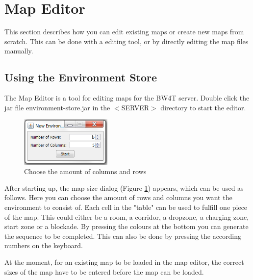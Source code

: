 \newpage

\section{Map Editor}\label{MapEditor}
This section describes how you can edit existing maps or create new maps from scratch. This can be done with a editing tool, or by directly editing the map files manually.




\subsection{Using the Environment Store}
The Map Editor is a tool for editing maps for the BW4T server. Double click the jar file environment-store.jar  in the $<$SERVER$>$ directory to start the  editor.

\begin{figure}
  \begin{center}
    \includegraphics[width=0.4\textwidth]{EnvironmentStore/SizeDialog.png}
  \end{center}
  \caption{Choose the amount of columns and rows}\label{fig:MapSize}
\end{figure}


After starting up, the map size dialog (Figure \ref{fig:MapSize}) appears, which can be used as follows.
Here you can choose the amount of rows and columns you want the environment to consist of. Each cell in the "table" can be used to fulfill one piece of the map. This could either be a room, a corridor, a dropzone, a charging zone, start zone or a blockade. By pressing the colours at the bottom you can generate the sequence to be completed. This can also be done by pressing the according numbers on the keyboard. 



At the moment, for an existing map to be loaded in the map editor, the correct sizes of the map have to be entered before the map can be loaded.

